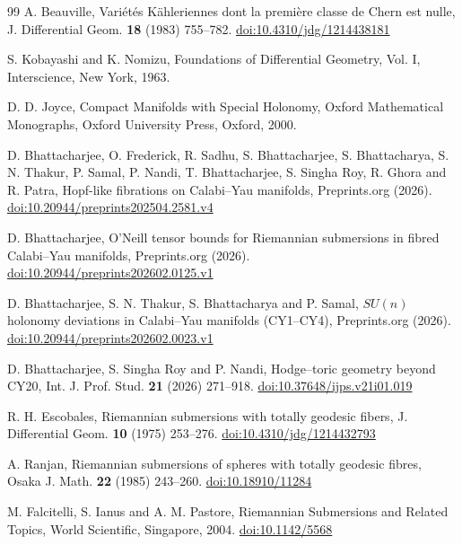 \documentclass[11pt,reqno]{amsart}
\theoremstyle{plain}
\theoremstyle{definition}
\begin{document}
\begin{thebibliography}{99}
 A. Beauville, Vari\'et\'es K\"ahleriennes dont la premi\`ere classe de Chern est nulle, J. Differential Geom. \textbf{18} (1983) 755--782. \href{https://doi.org/10.4310/jdg/1214438181}{doi:10.4310/jdg/1214438181}

 S. Kobayashi and K. Nomizu, Foundations of Differential Geometry, Vol. I, Interscience, New York, 1963.

 D. D. Joyce, Compact Manifolds with Special Holonomy, Oxford Mathematical Monographs, Oxford University Press, Oxford, 2000.

 D. Bhattacharjee, O. Frederick, R. Sadhu, S. Bhattacharjee, S. Bhattacharya, S. N. Thakur, P. Samal, P. Nandi, T. Bhattacharjee, S. Singha Roy, R. Ghora and R. Patra, Hopf-like fibrations on Calabi--Yau manifolds, Preprints.org (2026). \href{https://doi.org/10.20944/preprints202504.2581.v4}{doi:10.20944/preprints202504.2581.v4}

 D. Bhattacharjee, O'Neill tensor bounds for Riemannian submersions in fibred Calabi--Yau manifolds, Preprints.org (2026). \href{https://doi.org/10.20944/preprints202602.0125.v1}{doi:10.20944/preprints202602.0125.v1}

 D. Bhattacharjee, S. N. Thakur, S. Bhattacharya and P. Samal, $SU(n)$ holonomy deviations in Calabi--Yau manifolds (CY1--CY4), Preprints.org (2026). \href{https://doi.org/10.20944/preprints202602.0023.v1}{doi:10.20944/preprints202602.0023.v1}

 D. Bhattacharjee, S. Singha Roy and P. Nandi, Hodge--toric geometry beyond CY20, Int. J. Prof. Stud. \textbf{21} (2026) 271--918. \href{https://doi.org/10.37648/ijps.v21i01.019}{doi:10.37648/ijps.v21i01.019}

 R. H. Escobales, Riemannian submersions with totally geodesic fibers, J. Differential Geom. \textbf{10} (1975) 253--276. \href{https://doi.org/10.4310/jdg/1214432793}{doi:10.4310/jdg/1214432793}

 A. Ranjan, Riemannian submersions of spheres with totally geodesic fibres, Osaka J. Math. \textbf{22} (1985) 243--260. \href{https://doi.org/10.18910/11284}{doi:10.18910/11284}

 M. Falcitelli, S. Ianus and A. M. Pastore, Riemannian Submersions and Related Topics, World Scientific, Singapore, 2004. \href{https://doi.org/10.1142/5568}{doi:10.1142/5568}


\end{thebibliography}
\end{document}
